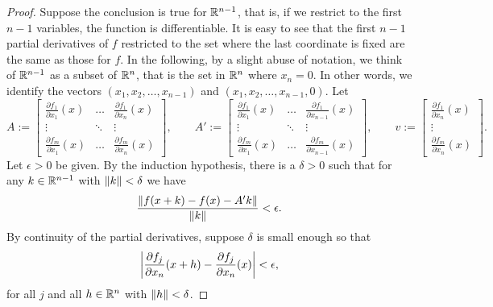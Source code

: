 \begin{proof}
Suppose the conclusion is true for ${\mathbb{R}}^{n-1}$,
that is,
if we restrict to the first $n-1$ variables, the function is differentiable.
It is easy to see that the first $n-1$
partial derivatives of $f$ restricted to the set where the last coordinate is
fixed are the same as those for $f$.
In the following, by a slight abuse of notation,
we think of ${\mathbb{R}}^{n-1}$ as a subset of ${\mathbb{R}}^n$, that is the set in ${\mathbb{R}}^n$ where $x_n = 0$.
In other words, we identify the vectors $(x_1,x_2,\ldots,x_{n-1})$ and
$(x_1,x_2,\ldots,x_{n-1},0)$.
Let
\begin{equation*}
A := 
\begin{bmatrix}
\frac{\partial f_1}{\partial x_1}(x)
& \ldots &
\frac{\partial f_1}{\partial x_n}(x)
\\
\vdots & \ddots & \vdots
\\
\frac{\partial f_m}{\partial x_1}(x)
& \ldots &
\frac{\partial f_m}{\partial x_n}(x)
\end{bmatrix} ,
\qquad
A' := 
\begin{bmatrix}
\frac{\partial f_1}{\partial x_1}(x)
& \ldots &
\frac{\partial f_1}{\partial x_{n-1}}(x)
\\
\vdots & \ddots & \vdots
\\
\frac{\partial f_m}{\partial x_1}(x)
& \ldots &
\frac{\partial f_m}{\partial x_{n-1}}(x)
\end{bmatrix} ,
\qquad
v := 
\begin{bmatrix}
\frac{\partial f_1}{\partial x_n}(x)
\\
\vdots
\\
\frac{\partial f_m}{\partial x_n}(x)
\end{bmatrix} .
\end{equation*}
Let $\epsilon > 0$ be given.  By the induction hypothesis, there
is a $\delta > 0$ such that
for any $k \in {\mathbb{R}}^{n-1}$ with $\lVert {k} \rVert < \delta$ we have
\begin{equation*}
\frac{\lVert {f(x+k) - f(x) - A' k} \rVert}{\lVert {k} \rVert} < \epsilon .
\end{equation*}
By continuity of the partial derivatives, suppose $\delta$ is small
enough so that
\begin{equation*}
\left\lvert {\frac{\partial f_j}{\partial x_n}(x+h)
      - \frac{\partial f_j}{\partial x_n}(x)} \right\rvert < \epsilon ,
\end{equation*}
for all $j$ and all $h \in {\mathbb{R}}^n$ with $\lVert {h} \rVert < \delta$.


\end{proof}
